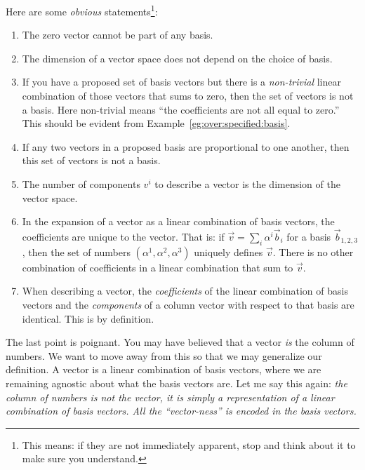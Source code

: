 \documentclass[12pt]{article}
\begin{document}
Here are some \emph{obvious} statements\footnote{This means: if they are not immediately apparent, stop and think about it to make sure you understand.}:
\begin{enumerate}
    \item The zero vector cannot be part of any basis.
    \item The dimension of a vector space does not depend on the choice of basis.
    \item If you have a proposed set of basis vectors but there is a \emph{non-trivial} linear combination of those vectors that sums to zero, then the set of vectors is not a basis. Here non-trivial means ``the coefficients are not all equal to zero.'' This should be evident from Example~\ref{eg:over:specified:basis}.
    \item If any two vectors in a proposed basis are proportional to one another, then this set of vectors is not a basis.
    \item The number of components $v^i$ to describe a vector is the dimension of the vector space.
    \item In the expansion of a vector as a linear combination of basis vectors, the coefficients are unique to the vector. That is: if $\vec{v} = \sum_i \alpha^i\vec{b}_i$ for a basis $\vec{b}_{1,2,3}$, then the set of numbers $(\alpha^1, \alpha^2, \alpha^3)$ uniquely defines $\vec{v}$. There is no other combination of coefficients in a linear combination that sum to $\vec{v}$. 
    \item When describing a vector, the \emph{coefficients} of the linear combination of basis vectors and the \emph{components} of a column vector with respect to that basis are identical. This is by definition. 
\end{enumerate}
The last point is poignant. You may have believed that a vector \emph{is} the column of numbers. We want to move away from this so that we may generalize our definition. A vector is a linear combination of basis vectors, where we are remaining agnostic about what the basis vectors are. Let me say this again: \emph{the column of numbers is not the vector, it is simply a representation of a linear combination of basis vectors. All the ``vector-ness'' is encoded in the basis vectors.}
\end{document}
